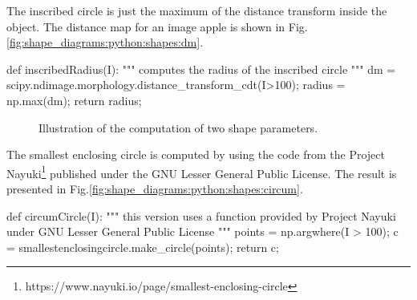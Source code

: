 The inscribed circle is just the maximum of the distance transform inside the object. The distance map for an image apple is shown in Fig.\ref{fig:shape_diagrams:python:shapes:dm}.
\begin{python}
def inscribedRadius(I):
    """
    computes the radius of the inscribed circle
    """
    dm = scipy.ndimage.morphology.distance_transform_cdt(I>100);
    radius = np.max(dm);
    return radius;
\end{python}

\begin{figure}[H]
\centering\caption{Illustration of the computation of two shape parameters.}
\hfill
{}%
\label{fig:shape_diagrams:python:shapes}%
\end{figure}

The smallest enclosing circle is computed by using the code from the Project Nayuki\footnote{https://www.nayuki.io/page/smallest-enclosing-circle} published under the GNU Lesser General Public License. The result is presented in Fig.\ref{fig:shape_diagrams:python:shapes:circum}.
\begin{python}
def circumCircle(I):
    """
    this version uses a function provided by Project Nayuki
    under GNU Lesser General Public License
    """
    points = np.argwhere(I > 100);
    c = smallestenclosingcircle.make_circle(points);
    return c;
\end{python}

